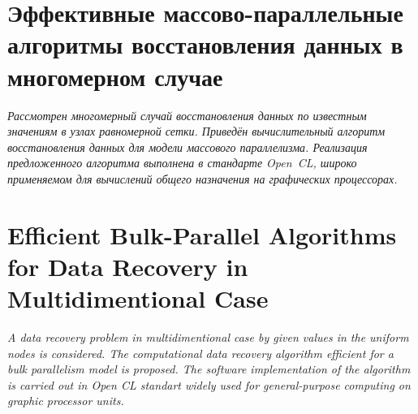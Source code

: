 


\section*{ 
Эффективные массово-параллельные 
алгоритмы восстановления данных в многомерном случае
}

\bigskip

\textit{
  Рассмотрен многомерный случай восстановления данных
  по известным значениям в узлах равномерной сетки. 
  Приведён вычислительный алгоритм восстановления данных для модели массового параллелизма.
  Реализация предложенного алгоритма выполнена в стандарте Open~CL,
  широко применяемом для вычислений общего назначения на графических процессорах.%
}


\section*{ 
  Efficient Bulk-Parallel Algorithms
  for Data Recovery in Multidimentional Case
}


\textit{
  A data recovery problem in multidimentional case
  by given values in the uniform nodes is considered.
  The computational data recovery algorithm efficient
  for a bulk parallelism model
  is proposed.
  The software implementation of the algorithm is carried out
  in Open CL standart widely used for 
  general-purpose computing on graphic processor units.
  }




